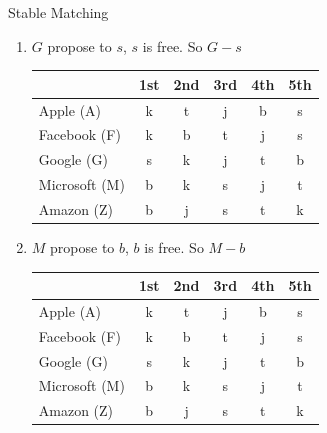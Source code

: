 \documentclass{article}
\numberwithin{table}{section}
\numberwithin{figure}{section}
\begin{document}
\begin{section}{Stable Matching}
\begin{enumerate} [(A)]
\begin{enumerate}[(1)]
\begin{tcolorbox}[breakable]
\begin{enumerate}[(1)]
                    \item $G$ propose to $s$, $s$ is free. So $G-s$
                    \begin{table}[H]
                        \centering
                        \begin{tabular}{|m{2.5cm}|*{5}{c|}}
                            \hline
                            & 1st & 2nd & 3rd & 4th & 5th \\
                            \hline
                            Apple (A)        & {\color{blue} k} & {\color{red} t} & j & b & s \\
                            Facebook (F)     & {\color{red} k} & b & t & j & s \\
                            Google (G)       & {\color{red} s} & k & j & t & b \\
                            Microsoft (M)    & b & k & s & j & t \\
                            Amazon (Z)       & b & j & s & t & k \\
                            \hline                            
                        \end{tabular}
                    \end{table}                    

                    \item $M$ propose to $b$, $b$ is free. So $M-b$
                    \begin{table}[H]
                        \centering
                        \begin{tabular}{|m{2.5cm}|*{5}{c|}}
                            \hline
                            & 1st & 2nd & 3rd & 4th & 5th \\
                            \hline
                            Apple (A)        & {\color{blue} k} & {\color{red} t} & j & b & s \\
                            Facebook (F)     & {\color{red} k} & b & t & j & s \\
                            Google (G)       & {\color{red} s} & k & j & t & b \\
                            Microsoft (M)    & {\color{red} b} & k & s & j & t \\
                            Amazon (Z)       & b & j & s & t & k \\
                            \hline                            
                        \end{tabular}
                    \end{table}   


\end{enumerate}
\end{tcolorbox}
\end{enumerate}
\end{enumerate}
\end{section}
\end{document}
